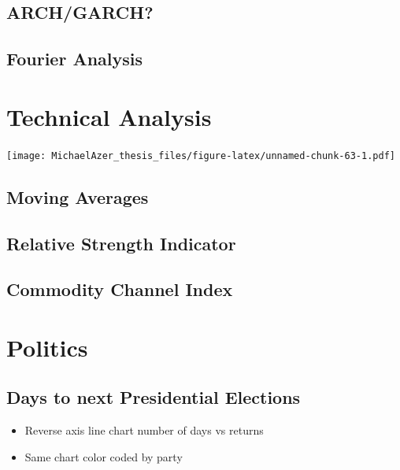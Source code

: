 \documentclass[]{book}
\providecommand{\tightlist}{%
  \setlength{\itemsep}{0pt}\setlength{\parskip}{0pt}}
\begin{document}
\hypertarget{archgarch}{%
\subsection{ARCH/GARCH?}\label{archgarch}}

\hypertarget{fourier-analysis}{%
\subsection{Fourier Analysis}\label{fourier-analysis}}

\hypertarget{technical-analysis}{%
\section{Technical Analysis}\label{technical-analysis}}

\texttt{[image: MichaelAzer\_thesis\_files/figure-latex/unnamed-chunk-63-1.pdf]}

\hypertarget{moving-averages}{%
\subsection{Moving Averages}\label{moving-averages}}

\hypertarget{relative-strength-indicator}{%
\subsection{Relative Strength Indicator}\label{relative-strength-indicator}}

\hypertarget{commodity-channel-index}{%
\subsection{Commodity Channel Index}\label{commodity-channel-index}}

\hypertarget{politics}{%
\section{Politics}\label{politics}}

\hypertarget{days-to-next-presidential-elections}{%
\subsection{Days to next Presidential Elections}\label{days-to-next-presidential-elections}}

\begin{itemize}
\tightlist
\item
  Reverse axis line chart number of days vs returns
\item
  Same chart color coded by party
\end{itemize}
\end{document}
